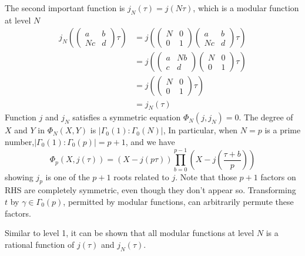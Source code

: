 \documentclass[]{article}
\begin{document}
The second important function is $j_N(\tau) = j(N\tau)$, which is a modular function at level $N$
\begin{align*}
j_N\left(\left(\begin{matrix}a & b \\ Nc & d\end{matrix}\right)\tau\right) &= j\left(\left(\begin{matrix}N & 0 \\0 & 1\end{matrix}\right)\left(\begin{matrix}a & b \\ Nc & d\end{matrix}\right)\tau\right) \\
&= j\left(\left(\begin{matrix}a & Nb \\ c & d\end{matrix}\right)\left(\begin{matrix}N & 0 \\0 & 1\end{matrix}\right)\tau\right) \\
&= j\left(\left(\begin{matrix}N & 0 \\0 & 1\end{matrix}\right)\tau\right) \\ 
&= j_N\left(\tau\right)
\end{align*}
Function $j$ and $j_N$ satisfies a symmetric equation $\Phi_N(j, j_N) = 0$. The degree of $X$ and $Y$ in $\Phi_N(X, Y)$ is $|\Gamma_0(1):\Gamma_0(N)|$, In particular, when $N = p$ is a prime number,$|\Gamma_0(1):\Gamma_0(p)| = p + 1$, and we have
\[
	\Phi_p(X, j(\tau)) = (X- j(p\tau)) \prod_{b = 0}^{p-1}\left(X - j\left(\frac{\tau +b}{p}\right)\right)
\] 
showing $j_p$ is one of the $p+1$ roots related to $j$. Note that those $p+1$ factors on RHS are completely symmetric, even though they don't appear so. Transforming $t$ by $\gamma \in \Gamma_0(p)$, permitted by modular functions, can arbitrarily permute these factors.

Similar to level 1, it can be shown that all modular functions at level $N$ is a rational function of $j(\tau)$ and $j_N(\tau)$.
\end{document}
